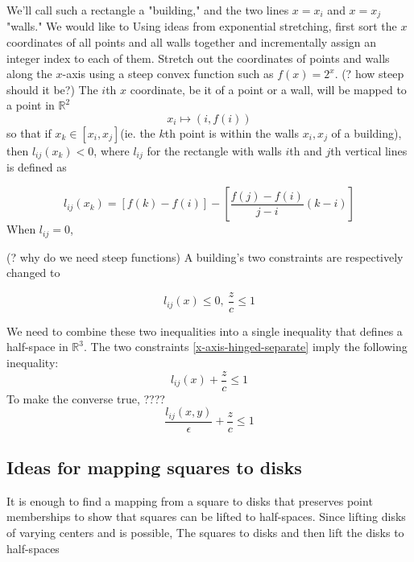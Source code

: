 \documentclass{NSF}
\begin{document}
We'll call such a rectangle a "building," and the two lines $x=x_i$ and $x=x_j$ "walls."
We would like to 
Using ideas from exponential stretching, first sort the $x$ coordinates of all points and all walls together and incrementally assign an integer index to each of them. Stretch out the coordinates of points and walls along the $x$-axis using a steep convex function such as $f(x)=2^x$. 
(? how steep should it be?)
The $i$th $x$ coordinate, be it of a point or a wall, will be mapped to a point in $\mathbb{R}^2$
\begin{equation}
	x_i \mapsto (i, f(i))
\end{equation}
so that if $x_k \in [x_i,x_j]$(ie. the $k$th point is within the walls $x_i,x_j$ of a building), then $l_{ij}(x_k) < 0 $, where $l_{ij}$ for the rectangle with walls  $i$th and $j$th vertical lines is defined as

\begin{equation*}
    l_{ij}(x_k) = [f(k) - f(i)] -[\frac{f(j)-f(i)}{j-i}(k - i)]
\end{equation*}
When $l_{ij}=0$, 

(? why do we need steep functions)
A building's two constraints are respectively changed to 

\begin{equation}\label{x-axis-hinged-separate}
    l_{ij}(x) \leq 0, \ \frac{z}{c} \leq 1
\end{equation}


We need to combine these two inequalities into a single inequality that defines a half-space in $\mathbb{R}^3$. 
The two constraints \eqref{x-axis-hinged-separate} imply the following inequality:
\begin{equation}\label{x-axis-hinged-added}
    l_{ij}(x) + \frac{z}{c} \leq 1 
\end{equation}
To make the converse true, ????
\begin{equation}
	\frac{l_{ij}(x,y)}{\epsilon} + \frac{z}{c} \leq 1
\end{equation}


\subsection{Ideas for mapping squares to disks}
It is enough to find a mapping from a square to disks that preserves point memberships to show that squares can be lifted to half-spaces. Since lifting disks of varying centers and is possible,  The squares to disks and then lift the disks to half-spaces
\end{document}
